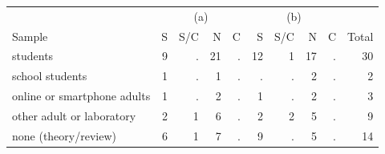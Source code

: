 \begin{center}\small
\begin{tabular}{@{}lrrrrrrrrr@{}}\toprule
 & \multicolumn{4}{c}{(a)} & \multicolumn{4}{c}{(b)} & \\
Sample & S & S/C & N & C & S & S/C & N & C & Total \\ \midrule
students & 9 & . & 21 & . & 12 & 1 & 17 & . & 30 \\
school students & 1 & . & 1 & . & . & . & 2 & . & 2 \\
online or smartphone adults & 1 & . & 2 & . & 1 & . & 2 & . & 3 \\
other adult or laboratory & 2 & 1 & 6 & . & 2 & 2 & 5 & . & 9 \\
none (theory/review) & 6 & 1 & 7 & . & 9 & . & 5 & . & 14 \\
\bottomrule\end{tabular}\end{center}
